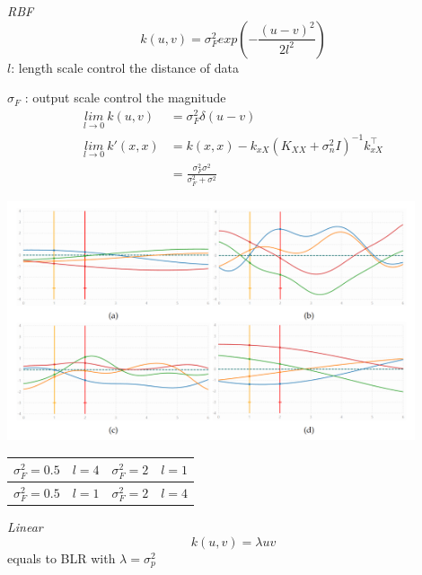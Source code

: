 \documentclass[landscape,a0paper,fontscale=0.285]{baposter} %
\begin{document}
\begin{poster}
{\textit{RBF}\vspace{-0.3cm}
$$
k(u,v) = \sigma_F^2  exp\left(-\frac{(u-v)^2}{2l^2}\right)
$$
$l$:  length scale control the distance of data

$\sigma_F$ : output scale  control  the magnitude
$$
\begin{aligned}
\underset{l\rightarrow 0}{lim}~k(u,v) &= \sigma_F^2\delta(u-v)\\
\underset{l\rightarrow 0}{lim}~k'(x,x) &= k(x,x) - k_{xX}(K_{XX}+\sigma_n^2 I)^{-1}k_{xX}^\top \\
&= \frac{\sigma_F^2\sigma^2}{\sigma_F^2 + \sigma^2}
\end{aligned}
$$
\begin{center}
\includegraphics[width=0.9\textwidth, trim={0cm 3cm 0 2cm},clip]{figures/9ZdGX6UqMPl2WkR.png}
    \begin{tabular}{c | c}
         $\sigma_F^2=0.5\quad l=4$ & $\sigma_F^2=2\quad l=1$ \\\hline
         $\sigma_F^2=0.5\quad l=1$ & $\sigma_F^2=2\quad l=4$
    \end{tabular}
\end{center}

\textit{Linear}\vspace{-0.3cm}
$$
k(u,v) = \lambda uv
$$
equals to BLR with $\lambda  = \sigma_p^2$

\begin{center}
    


\end{center}}
\end{poster}
\end{document}

